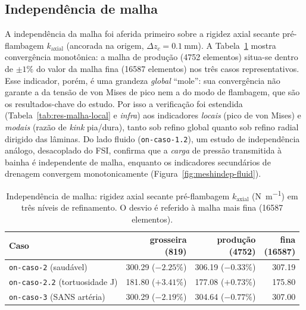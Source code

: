 \subsection*{Independência de malha}
\label{sec:res-malha}

A independência da malha foi aferida primeiro sobre a rigidez axial secante pré-flambagem $k_{\mathrm{axial}}$ (ancorada na origem, $\Delta z_c = \SI{0.1}{\milli\meter}$). A Tabela~\ref{tab:res-malha} mostra convergência monotônica: a malha de produção (\num{4752} elementos) situa-se dentro de $\pm 1\%$ do valor da malha fina (\num{16587} elementos) nos três casos representativos. Esse indicador, porém, é uma grandeza \emph{global} ``mole'': sua convergência não garante a da tensão de von Mises de pico nem a do modo de flambagem, que são os resultados-chave do estudo. Por isso a verificação foi estendida (Tabela~\ref{tab:res-malha-local} e \emph{infra}) aos indicadores \emph{locais} (pico de von Mises) e \emph{modais} (razão de \emph{kink} pia/dura), tanto sob refino global quanto sob refino radial dirigido das lâminas. Do lado fluido (\texttt{on-caso-1.2}), um estudo de independência análogo, desacoplado do FSI, confirma que a \emph{carga} de pressão transmitida à bainha é independente de malha, enquanto os indicadores secundários de drenagem convergem monotonicamente (Figura~\ref{fig:meshindep-fluid}).

\begin{table}[h!]
\centering
\small
\caption{Independência de malha: rigidez axial secante pré-flambagem
$k_{\mathrm{axial}}$ (\si{\newton\per\meter}) em três níveis de refinamento. O
desvio é referido à malha mais fina (\num{16587} elementos).}
\label{tab:res-malha}
\begin{tabular}{l r r r}
\toprule
\textbf{Caso} & \makecell{grosseira\\(\num{819})} & \makecell{produção\\(\num{4752})} & \makecell{fina\\(\num{16587})} \\
\midrule
\texttt{on-caso-2} (saudável)        & 300.29 ($-2.25\%$) & 306.19 ($-0.33\%$) & 307.19 \\
\texttt{on-caso-2.2} (tortuosidade J) & 181.80 ($+3.41\%$) & 177.08 ($+0.73\%$) & 175.80 \\
\texttt{on-caso-3} (SANS artéria)    & 300.29 ($-2.19\%$) & 304.64 ($-0.77\%$) & 307.00 \\
\bottomrule
\end{tabular}
\end{table}

